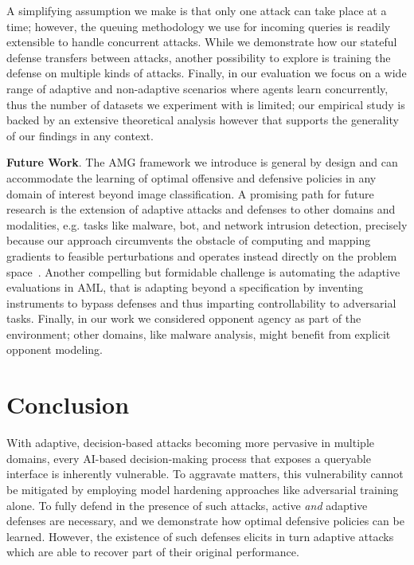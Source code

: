 A simplifying assumption we make is that only one attack can take place at a time; however, the queuing methodology we use for incoming queries is readily extensible to handle concurrent attacks.
While we demonstrate how our stateful defense transfers between attacks, another possibility to explore is training the defense on multiple kinds of attacks.
Finally, in our evaluation we focus on a wide range of adaptive and non-adaptive scenarios where agents learn concurrently, thus the number of datasets we experiment with is limited; our empirical study is backed by an extensive theoretical analysis however that supports the generality of our findings in any context.

\textbf{Future Work}.
The AMG framework we introduce is general by design and can accommodate the learning of optimal offensive and defensive policies in any domain of interest beyond image classification.
A promising path for future research is the extension of adaptive attacks and defenses to other domains and modalities, e.g. tasks like malware, bot, and network intrusion detection, precisely because our approach circumvents the obstacle of computing and mapping gradients to feasible perturbations and operates instead directly on the problem space~\cite{pierazzi2020intriguing}.
Another compelling but formidable challenge is automating the adaptive evaluations in \gls{AML}, that is adapting beyond a specification by inventing instruments to bypass defenses and thus imparting controllability to adversarial tasks.
Finally, in our work we considered opponent agency as part of the environment; other domains, like malware analysis, might benefit from explicit opponent modeling.

\section{Conclusion}

With adaptive, decision-based attacks becoming more pervasive in multiple domains, every AI-based decision-making process that exposes a queryable interface is inherently vulnerable.
To aggravate matters, this vulnerability cannot be mitigated by employing model hardening approaches like adversarial training alone.
To fully defend in the presence of such attacks, active \emph{and} adaptive defenses are necessary, and we demonstrate how optimal defensive policies can be learned.
However, the existence of such defenses elicits in turn adaptive attacks which are able to recover part of their original performance.

